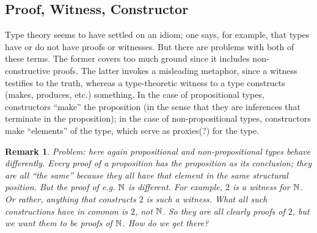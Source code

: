 \documentclass[12pt,toc]{tufte-handout}
\newtheorem{remark}{Remark}
\begin{document}
\subsection{Proof, Witness, Constructor}
\label{subs:pwc}

Type theory seems to have settled on an idiom; one says, for example,
that types have or do not have proofs or witnesses.  But there are
problems with both of these terms.  The former covers too much ground
since it includes non-constructive proofs.  The latter invokes a
misleading metaphor, since a witness testifies to the truth, whereas a
type-theoretic witness to a type constructs (makes, produces, etc.)
something.  In the case of propositional types, constructors ``make''
the proposition (in the sense that they are inferences that terminate
in the proposition); in the case of non-propositional types,
constructors make ``elements'' of the type, which serve as proxies(?) for
the type.

\begin{remark}
  Problem: here again propositional and non-propositional types behave
  differently.  Every proof of a proposition has the proposition as
  its conclusion; they are all ``the same'' because they all have that
  element in the same structural position.  But the proof of
  e.g. \(\mathbb{N}\) is different.  For example, \(2\) is a witness for
  \(\mathbb{N}\).  Or rather, anything that constructs \(2\) is such a
  witness.  What all such constructions have in common is \(2\), not
  \(\mathbb{N}\).  So they are all clearly proofs of \(2\), but we want them
  to be proofs of \(\mathbb{N}\).  How do we get there?
\end{remark}




\end{document}
